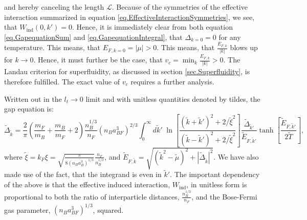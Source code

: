 and hereby canceling the length $\mathcal{L}$. Because of the symmetries of the effective interaction summarized in equation \eqref{eq.EffectiveInteractionSymmetries}, we see, that $W_{\text{ind}}(0,k') = 0$. Hence, it is immediately clear from both equation \eqref{eq.GapequationSum} and \eqref{eq.GapequationIntegral}, that $\Delta_{k=0} = 0$ for any temperature. This means, that $E_{F,k=0} = |\mu| > 0$. This means, that $\frac{E_{F,k}}{|k|}$ blows up for $k\to 0$. Hence, it must further be the case, that $v_c = \min_k \frac{E_{F,k}}{|k|} > 0$. The Landau criterion for superfluidity, as discussed in section \ref{sec.Superfluidity}, is therefore fulfilled. The exact value of $v_c$ requires a further analysis. 

Written out in the $l_t \to 0$ limit and with unitless quantities denoted by tildes, the gap equation is:
\begin{equation}
\tilde{\Delta}_{\tilde{k}} = \frac{2}{\pi}\left(\frac{m_F}{m_B} + \frac{m_B}{m_F}+ 2\right)\frac{n_B^{1/3}}{n_F}(n_Ba_{BF}^3)^{2/3} \int_0^\infty d\tilde{k}' \; \ln\left[\frac{(\tilde{k}+\tilde{k}')^2+2/\tilde{\xi}^2}{(\tilde{k}-\tilde{k}')^2+2/\tilde{\xi}^2}\right] \frac{\tilde{\Delta}_{\tilde{k}'}}{\tilde{E}_{F,\tilde{k}'}}\tanh\left[\frac{\tilde{E}_{F,\tilde{k}'}}{2\tilde{T}}\right],
\label{eq.GapequationIntegralUnitless}
\end{equation} 
where $\tilde{\xi} = k_F\xi = \sqrt{ \frac{\pi}{ 8(n_Ba_B^3)^{1/3} } } \frac{n_F}{n_B^{1/3}}$, and $\tilde{E}_{F,\tilde{k}} = \sqrt{(\tilde{k}^2-\tilde{\mu})^2 + |\tilde{\Delta}_{\tilde{k}}|^2}$. We have also made use of the fact, that the integrand is even in $\tilde{k}'$. The important dependency of the above is that the effective induced interaction, $W_{\text{ind}}$, in unitless form is proportional to both the ratio of interparticle distances, $\frac{n_B^{1/3}}{n_F}$, and the Bose-Fermi gas parameter, $(n_Ba_{BF}^3)^{1/3}$, squared.

